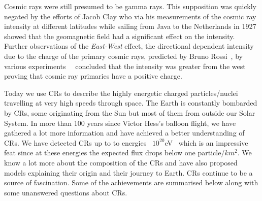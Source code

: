 Cosmic rays were still presumed to be gamma rays. This supposition was quickly negated by the efforts of Jacob Clay who via his measurements of the cosmic ray intensity at different latitudes while sailing from Java to the Netherlands in 1927~\cite{Clay:1927I} showed that the geomagnetic field had a significant effect on the intensity. Further observations of the \textit{East-West} effect, the directional dependent intensity due to the charge of the primary cosmic rays, predicted by Bruno Rossi~\cite{PhysRev.36.606}, by various experiments~\cite{PhysRev.43.834}~\cite{PhysRev.43.835} concluded that the intensity was greater from the west proving that cosmic ray primaries have a positive charge.

Today we use CRs to describe the highly energetic charged particles/nuclei travelling at very high speeds through space. The Earth is constantly bombarded by CRs, some originating from the Sun but most of them from outside our Solar System. In more than 100 years since Victor Hess's balloon flight, we have gathered a lot more information and have achieved a better understanding of CRs. We have detected CRs up to to energies ~$10^{20}$eV~\cite{TA_2023} which is an impressive feat since at these energies the expected flux drops below one particle/$km^2$. We know a lot more about the composition of the CRs and have also proposed models explaining their origin and their journey to Earth. CRs continue to be a source of fascination. Some of the achievements are summarised below along with some unanswered questions about CRs. 

